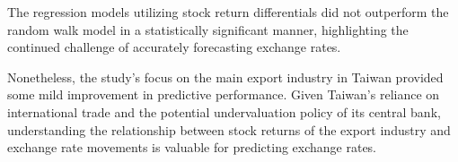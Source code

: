 \documentclass[]{AEA}
\begin{document}
\begin{spacing}{2.0}
The regression models utilizing stock return differentials did not outperform the random walk model in a statistically significant manner, highlighting the continued challenge of accurately forecasting exchange rates.

Nonetheless, the study's focus on the main export industry in Taiwan provided some mild improvement in predictive performance. Given Taiwan's reliance on international trade and the potential undervaluation policy of its central bank, understanding the relationship between stock returns of the export industry and exchange rate movements is valuable for predicting exchange rates.




\end{spacing}

\newpage



\end{document}

